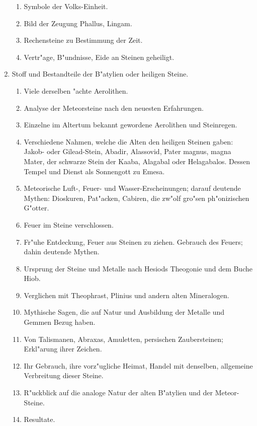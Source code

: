 \documentclass[a4paper, 11pt, oneside, polutonikogreek, german]{article}
\begin{document}
\begin{enumerate}
\begin{enumerate}
        \item Symbole der Volks-Einheit.
        \item Bild der Zeugung Phallus, Lingam.
        \item Rechensteine zu Bestimmung der Zeit.
        \item Vertr"age, B"undnisse, Eide an Steinen geheiligt.
    \end{enumerate}
    \item Stoff und Bestandteile der B"atylien oder heiligen Steine.
    \begin{enumerate}
        \item Viele derselben "achte Aerolithen.
        \item Analyse der Meteorsteine nach den neuesten Erfahrungen.
        \item Einzelne im Altertum bekannt gewordene Aerolithen und Steinregen.
        \item Verschiedene Nahmen, welche die Alten den heiligen Steinen gaben: Jakob- oder Gilead-Stein, Abadir, Alassovid, Pater magnus, magna Mater, der schwarze Stein der Kaaba, Alagabal oder Helagabalos. Dessen Tempel und Dienst als Sonnengott zu Emesa.
        \item Meteorische Luft-, Feuer- und Wasser-Erscheinungen; darauf deutende Mythen: Dioskuren, Pat"acken, Cabiren, die zw"olf gro"sen ph"onizischen G"otter.
        \item Feuer im Steine verschlossen.
        \item Fr"uhe Entdeckung, Feuer aus Steinen zu ziehen. Gebrauch des Feuers; dahin deutende Mythen.
        \item Ursprung der Steine und Metalle nach Hesiods Theogonie und dem Buche Hiob.
        \item Verglichen mit Theophrast, Plinius und andern alten Mineralogen.
        \item Mythische Sagen, die auf Natur und Ausbildung der Metalle und Gemmen Bezug haben.
        \item Von Talismanen, Abraxas, Amuletten, persischen Zaubersteinen; Erkl"arung ihrer Zeichen.
        \item Ihr Gebrauch, ihre vorz"ugliche Heimat, Handel mit denselben, allgemeine Verbreitung dieser Steine.
        \item R"uckblick auf die analoge Natur der alten B"atylien und der Meteor-Steine.
        \item Resultate.
    \end{enumerate}
\end{enumerate}
\clearpage
\end{document}
